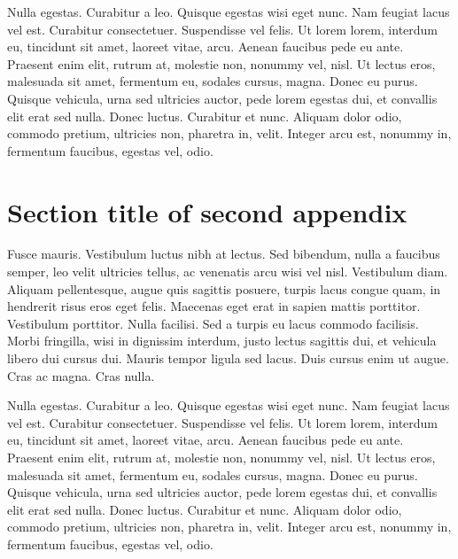 \documentclass[AMS,STIX2COL]{WileyNJD-v2}
\begin{document}
    Nulla egestas. Curabitur a leo. Quisque egestas wisi eget nunc. Nam feugiat lacus vel est. Curabitur consectetuer.
    Suspendisse vel felis. Ut lorem lorem, interdum eu, tincidunt sit amet, laoreet vitae, arcu. Aenean faucibus pede eu
    ante. Praesent enim elit, rutrum at, molestie non, nonummy vel, nisl. Ut lectus eros, malesuada sit amet, fermentum
    eu, sodales cursus, magna. Donec eu purus. Quisque vehicula, urna sed ultricies auctor, pede lorem egestas dui, et
    convallis elit erat sed nulla. Donec luctus. Curabitur et nunc. Aliquam dolor odio, commodo pretium, ultricies non,
    pharetra in, velit. Integer arcu est, nonummy in, fermentum faucibus, egestas vel, odio.


    \section{Section title of second appendix\label{app2}}%

    Fusce mauris. Vestibulum luctus nibh at lectus. Sed bibendum, nulla a faucibus semper, leo velit ultricies tellus, ac
    venenatis arcu wisi vel nisl. Vestibulum diam. Aliquam pellentesque, augue quis sagittis posuere, turpis lacus congue
    quam, in hendrerit risus eros eget felis. Maecenas eget erat in sapien mattis porttitor. Vestibulum porttitor. Nulla
    facilisi. Sed a turpis eu lacus commodo facilisis. Morbi fringilla, wisi in dignissim interdum, justo lectus sagittis dui, et
    vehicula libero dui cursus dui. Mauris tempor ligula sed lacus. Duis cursus enim ut augue. Cras ac magna. Cras nulla.

    Nulla egestas. Curabitur a leo. Quisque egestas wisi eget nunc. Nam feugiat lacus vel est. Curabitur consectetuer.
    Suspendisse vel felis. Ut lorem lorem, interdum eu, tincidunt sit amet, laoreet vitae, arcu. Aenean faucibus pede eu
    ante. Praesent enim elit, rutrum at, molestie non, nonummy vel, nisl. Ut lectus eros, malesuada sit amet, fermentum
    eu, sodales cursus, magna. Donec eu purus. Quisque vehicula, urna sed ultricies auctor, pede lorem egestas dui, et
    convallis elit erat sed nulla. Donec luctus. Curabitur et nunc. Aliquam dolor odio, commodo pretium, ultricies non,
    pharetra in, velit. Integer arcu est, nonummy in, fermentum faucibus, egestas vel, odio.
\end{document}
